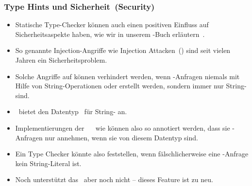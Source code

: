 \documentclass[aspectratio=169,mathserif,notheorems]{beamer}%
\begin{document}
\begin{frame}%
\frametitle{Type Hints und Sicherheit~(Security)}%
\begin{itemize}%
\item Statische Type-Checker können auch einen positiven Einfluss auf Sicherheitsaspekte haben, wie wir in unserem -Buch erläutern~\cite{databases}.%
%
\item<2-> So genannte Injection-Angriffe wie  Injection Attacken~() sind seit vielen Jahren ein Sicherheitsproblem.%
\item<3-> Solche Angriffe auf  können verhindert werden, wenn \sql-Anfragen niemals mit Hilfe von String-Operationen oder  erstellt werden, sondern immer nur String- sind.%
%
\item<4-> \python\ bietet den Datentyp~ für String- an\cite{PEP675}.%
%
\item<5-> Implementierungen der \python\ \db\  wie \psycopg\cite{VDGE2022PPDAFP:ST} können also so annotiert werden, dass sie \sql-Anfragen nur annehmen, wenn sie von diesem Datentyp sind.%
%
\item<6-> Ein Type Checker könnte also feststellen, wenn fälschlicherweise eine \sql-Anfrage kein String-Literal ist.%
%
\item<7-> Noch unterstützt das \mypy\ aber noch nicht -- dieses Feature ist zu neu\cite{ZDWVSLS2022I1SP6L,VDGE2022PPDAFP:ST}.%
%
\end{itemize}%
\end{frame}%
%
%
\end{document}
